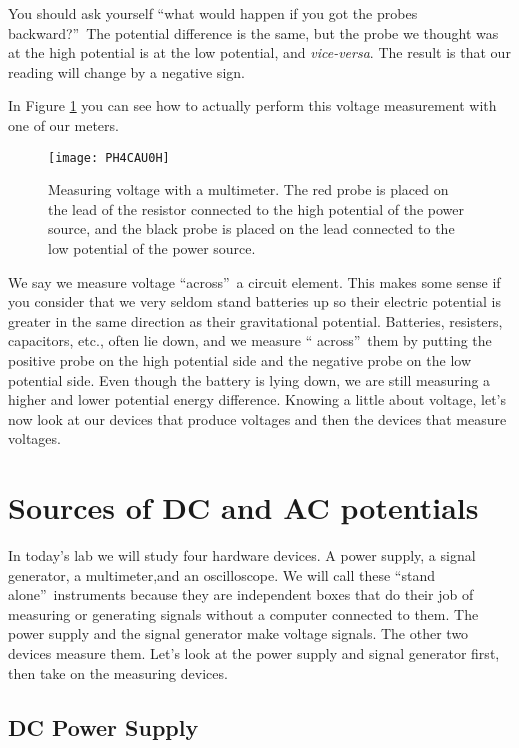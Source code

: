 You should ask yourself
\textquotedblleft what would happen if you got the probes
backward?\textquotedblright\ The potential difference is the same, but the
probe we thought was at the high potential is at the low potential, and
\textit{vice-versa}. The result is that our reading will change by a 
negative sign.

In Figure \ref{fig:measuring_voltage} 
you can see how to actually perform this voltage
measurement with one of our meters.
\begin{figure}[htbp!]
\texttt{[image: PH4CAU0H]}
\caption[Measuring voltage with a multimeter]{Measuring voltage with a 
multimeter. The red probe is placed on the lead of the resistor connected
to the high potential of the power source, and the black probe is placed on
the lead connected to the low potential of the power source.}
\label{fig:measuring_voltage}
\end{figure}

We say we measure voltage \textquotedblleft across\textquotedblright\ a
circuit element. This makes some sense if you consider that we very seldom
stand batteries up so their electric potential is greater in the same
direction as their gravitational potential. Batteries, resisters,
capacitors, etc., often lie down, and we measure \textquotedblleft
across\textquotedblright\ them by putting the positive probe on the high
potential side and the negative probe on the low potential side. Even though
the battery is lying down, we are still measuring a higher and lower
potential energy difference. Knowing a little about voltage, let's now look at
our devices that produce voltages and then the devices that measure voltages.

\section{Sources of DC and AC potentials}

In today's lab we will study four hardware devices. A power supply, a signal
generator, a multimeter,and an oscilloscope. We will call these
\textquotedblleft stand alone\textquotedblright\ instruments because they
are independent boxes that do their job of measuring or generating signals
without a computer connected to them. The power supply and the signal
generator make voltage signals. The other two devices measure them. Let's
look at the power supply and signal generator first, then take on the
measuring devices.

\subsection{DC Power Supply}

